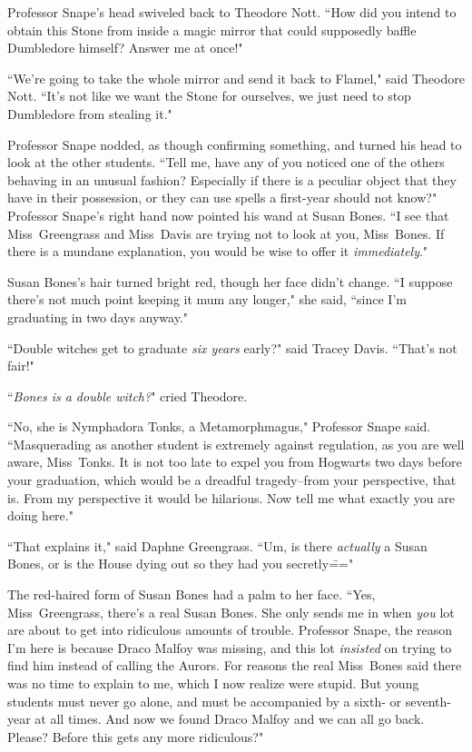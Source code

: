 Professor Snape's head swiveled back to Theodore Nott. ``How did you intend to obtain this Stone from inside a magic mirror that could supposedly baffle Dumbledore himself? Answer me at once!"

``We're going to take the whole mirror and send it back to Flamel," said Theodore Nott. ``It's not like we want the Stone for ourselves, we just need to stop Dumbledore from stealing it."

Professor Snape nodded, as though confirming something, and turned his head to look at the other students. ``Tell me, have any of you noticed one of the others behaving in an unusual fashion? Especially if there is a peculiar object that they have in their possession, or they can use spells a first-year should not know?" Professor Snape's right hand now pointed his wand at Susan Bones. ``I see that Miss~Greengrass and Miss~Davis are trying not to look at you, Miss~Bones. If there is a mundane explanation, you would be wise to offer it \emph{immediately}."

Susan Bones's hair turned bright red, though her face didn't change. ``I suppose there's not much point keeping it mum any longer," she said, ``since I'm graduating in two days anyway."

``Double witches get to graduate \emph{six years} early?" said Tracey Davis. ``That's not fair!"

``\emph{Bones is a double witch?}" cried Theodore.

``No, she is Nymphadora Tonks, a Metamorphmagus," Professor Snape said. ``Masquerading as another student is extremely against regulation, as you are well aware, Miss~Tonks. It is not too late to expel you from Hogwarts two days before your graduation, which would be a dreadful tragedy\---from your perspective, that is. From my perspective it would be hilarious. Now tell me what exactly you are doing here."

``That explains it," said Daphne Greengrass. ``Um, is there \emph{actually} a Susan Bones, or is the House dying out so they had you secretly\==="

The red-haired form of Susan Bones had a palm to her face. ``Yes, Miss~Greengrass, there's a real Susan Bones. She only sends me in when \emph{you} lot are about to get into ridiculous amounts of trouble. Professor Snape, the reason I'm here is because Draco Malfoy was missing, and this lot \emph{insisted} on trying to find him instead of calling the Aurors. For reasons the real Miss~Bones said there was no time to explain to me, which I now realize were stupid. But young students must never go alone, and must be accompanied by a sixth- or seventh-year at all times. And now we found Draco Malfoy and we can all go back. Please? Before this gets any more ridiculous?"

